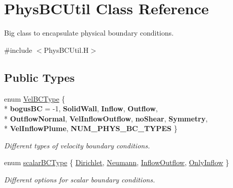 \hypertarget{class_phys_b_c_util}{\section{Phys\-B\-C\-Util Class Reference}
\label{class_phys_b_c_util}
}


Big class to encapsulate physical boundary conditions.  




{\ttfamily \#include $<$Phys\-B\-C\-Util.\-H$>$}

\subsection*{Public Types}
\begin{DoxyCompactItemize}
\item 
enum \hyperlink{class_phys_b_c_util_a1aaacd3006840779878dc6287355a358}{Vel\-B\-C\-Type} \{ \\*
{\bfseries bogus\-B\-C} = -\/1, 
{\bfseries Solid\-Wall}, 
{\bfseries Inflow}, 
{\bfseries Outflow}, 
\\*
{\bfseries Outflow\-Normal}, 
{\bfseries Vel\-Inflow\-Outflow}, 
{\bfseries no\-Shear}, 
{\bfseries Symmetry}, 
\\*
{\bfseries Vel\-Inflow\-Plume}, 
{\bfseries N\-U\-M\-\_\-\-P\-H\-Y\-S\-\_\-\-B\-C\-\_\-\-T\-Y\-P\-E\-S}
 \}
\begin{DoxyCompactList}\small\item\em Different types of velocity boundary conditions. \end{DoxyCompactList}\item 
enum \hyperlink{class_phys_b_c_util_a1beb9821cf9e783e3742b82b7070c97a}{scalar\-B\-C\-Type} \{ \hyperlink{class_phys_b_c_util_a1beb9821cf9e783e3742b82b7070c97aa3c458c6b8958fb7d8f8f575725a0e91c}{Dirichlet}, 
\hyperlink{class_phys_b_c_util_a1beb9821cf9e783e3742b82b7070c97aae1ec2629a88cd0c687f102296e995d6b}{Neumann}, 
\hyperlink{class_phys_b_c_util_a1beb9821cf9e783e3742b82b7070c97aae85fc8bb407faa51331a6602f82577b7}{Inflow\-Outflow}, 
\hyperlink{class_phys_b_c_util_a1beb9821cf9e783e3742b82b7070c97aa3f9f8b4486f10b1ae3cef04b812d882f}{Only\-Inflow}
 \}
\begin{DoxyCompactList}\small\item\em Different options for scalar boundary conditions. \end{DoxyCompactList}\end{DoxyCompactItemize}
